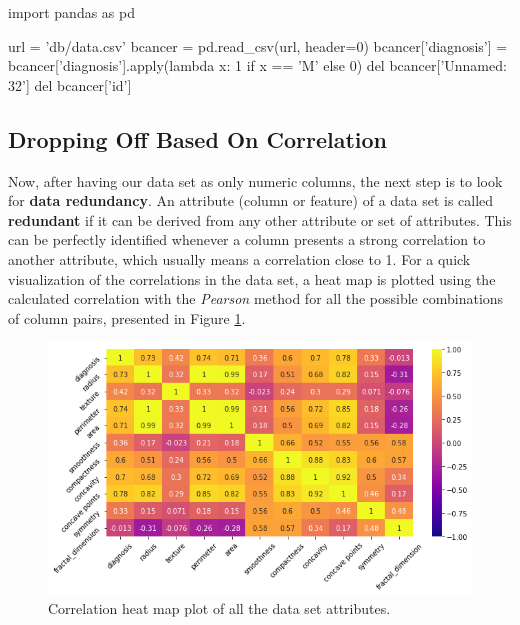 \documentclass[11pt]{article}
\begin{document}
\begin{python}
import pandas as pd

url = 'db/data.csv'
bcancer = pd.read_csv(url, header=0)
bcancer['diagnosis'] = bcancer['diagnosis'].apply(lambda x: 1 if x == 'M' else 0)
del bcancer['Unnamed: 32']
del bcancer['id']
\end{python}

\subsection{Dropping Off Based On Correlation}

Now, after having our data set as only numeric columns, the next step is to look for \textbf{data redundancy}. An attribute (column or feature) of a data set is called \textbf{redundant} if it can be derived from any other attribute or set of attributes. This can be perfectly identified whenever a column presents a strong correlation to another attribute, which usually means a correlation close to 1. For a quick visualization of the correlations in the data set, a heat map is plotted using the calculated correlation with the \textit{Pearson} method for all the possible combinations of column pairs, presented in Figure \ref{fig:corr}.

\begin{figure}[!ht]
\centering
    \includegraphics[width=5in]{correlation.png}
    \caption{Correlation heat map plot of all the data set attributes.}
    \label{fig:corr}
\end{figure}
\end{document}
